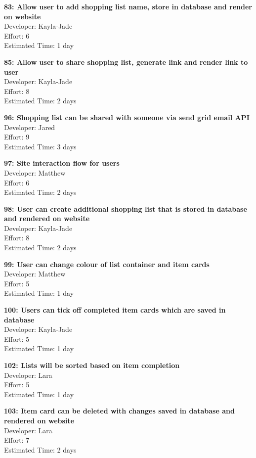 \documentclass[10pt,onecolumn]{witseiepaper}
\begin{document}
\textbf{83: Allow user to add shopping list name, store in database and render on website} \\
Developer: Kayla-Jade\\
Effort: 6\\
Estimated Time: 1 day

\textbf{85: Allow user to share shopping list, generate link and render link to user} \\
Developer: Kayla-Jade\\
Effort: 8\\
Estimated Time: 2 days


\textbf{96: Shopping list can be shared with someone via send grid email API} \\
Developer: Jared\\
Effort: 9\\
Estimated Time: 3 days

\textbf{97: Site interaction flow for users} \\
Developer: Matthew\\
Effort: 6\\
Estimated Time: 2 days
%

\textbf{98: User can create additional shopping list that is stored in database and rendered on website} \\
Developer: Kayla-Jade\\
Effort: 8\\
Estimated Time: 2 days

\textbf{99: User can change colour of list container and item cards} \\
Developer: Matthew\\
Effort: 5\\
Estimated Time: 1 day

\textbf{100: Users can tick off completed item cards which are saved in database} \\
Developer: Kayla-Jade\\
Effort: 5\\
Estimated Time: 1 day

\textbf{102: Lists will be sorted based on item completion} \\
Developer: Lara\\
Effort: 5\\
Estimated Time: 1 day

\textbf{103: Item card can be deleted with changes saved in database and rendered on website} \\
Developer: Lara\\
Effort: 7\\
Estimated Time: 2 days
\end{document}
